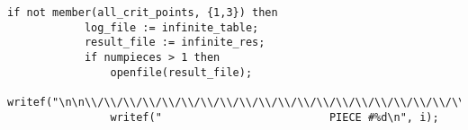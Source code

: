 \documentclass[a4paper,10pt]{article}
\begin{document}
\begin{lstlisting}[name=main]
        if not member(all_crit_points, {1,3}) then
            log_file := infinite_table;
            result_file := infinite_res;
            if numpieces > 1 then
                openfile(result_file);
                writef("\n\n\\/\\/\\/\\/\\/\\/\\/\\/\\/\\/\\/\\/\\/\\/\\/\\/\\/\\/\\/\\/\\/\\/\\/\\/\\/\\/\\/\\/\\/\\/\\/\\/\\/\\/\\/\\/\\/\\/\\/\\/\n");
                writef("                          PIECE #%d\n", i);

\end{lstlisting}
\end{document}
